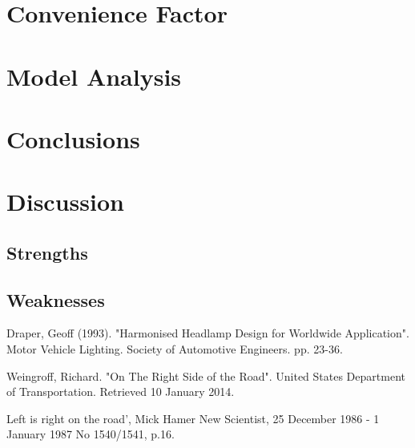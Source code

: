 \section{Convenience Factor}



\section{Model Analysis}



\section{Conclusions}




\section{Discussion}

\subsection{Strengths}
	
\subsection{Weaknesses}




\begin{thebibliography}{99}

 Draper, Geoff (1993). "Harmonised 
Headlamp Design for Worldwide Application". Motor Vehicle 
Lighting. Society of Automotive Engineers. pp. 23-36.

 Weingroff, Richard. "On The 
Right Side of the Road". United States Department of 
Transportation. Retrieved 10 January 2014.

 Left is right on the road', Mick Hamer 
New Scientist, 25 December 1986 - 1 January 1987 No 1540/1541, 
p.16.

\end{thebibliography}

